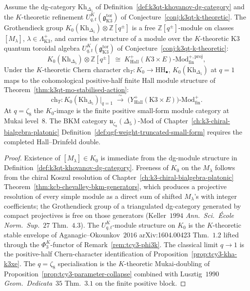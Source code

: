 \begin{theorem}
\label{thm:k3qt-k0-decategorification}
Assume the dg-category \(\mathrm{Kh}_{\Delta_5}\) of
Definition~\ref{def:k3qt-khovanov-dg-category} and the
\(K\)-theoretic refinement
\(U^K_{q,t}(\mathfrak g_{\mathrm{K3}}^{\mathrm{tor}})\) of
Conjecture~\ref{conj:k3qt-k-theoretic}.
The Grothendieck group $K_0(\mathrm{Kh}_{\Delta_5})\otimes\mathbb Z[q^\pm]$
is a free $\mathbb Z[q^\pm]$-module on classes $[M_\lambda]$,
$\lambda\in\Lambda_{\mathrm{K3}}^+$, and carries the structure of
a module over the $K$-theoretic K3 quantum toroidal algebra
$U^K_{q, t}(\mathfrak g_{\mathrm{K3}}^{\mathrm{tor}})$ of
Conjecture~\ref{conj:k3qt-k-theoretic}:
\[
 K_0(\mathrm{Kh}_{\Delta_5})\otimes\mathbb Z[q^\pm]
 \;\cong\;
 K^+_{\mathrm{Hall}}(K3\times E)\text{-}
 \mathrm{Mod}^{+,\mathrm{proj}}_{\mathrm{fin}},
\]
Under the $K$-theoretic Chern character
$\mathrm{ch}_T\colon K_0 \to \mathrm{HH}_\bullet$,
$K_0(\mathrm{Kh}_{\Delta_5})$ at $q = 1$ maps to the cohomological
positive-half finite Hall module structure of
Theorem~\ref{thm:k3qt-mo-stabilised-action}:
\[
 \mathrm{ch}_T : K_0(\mathrm{Kh}_{\Delta_5})\bigl|_{q = 1}
 \;\xrightarrow{\;\sim\;}\;
 \bigl(Y^+_{\mathrm{Hall}}(\mathrm{K3}\times E)\bigr)\text{-}
 \mathrm{Mod}^{+}_{\mathrm{fin}}.
\]
At $q=\zeta_8$ the $K_0$-image is the finite positive small-form
module category at Mukai level~$8$. The BKM category
$\mathfrak u_{\zeta_8}(\Delta_5)\text{-}\mathrm{Mod}$ of
Chapter~\ref{ch:k3-chiral-bialgebra-platonic}
Definition~\ref{def:qgf-weight-truncated-small-form} requires the
completed Hall--Drinfeld double.
\end{theorem}

\begin{proof}
Existence of $[M_\lambda]\in K_0$ is immediate from the dg-module
structure in Definition~\ref{def:k3qt-khovanov-dg-category}.
Freeness of $K_0$ on the $M_\lambda$ follows from the chiral Koszul
resolution of
Chapter~\ref{ch:k3-chiral-bialgebra-platonic}
Theorem~\ref{thm:kcb-chevalley-bkm-generators}, which produces a
projective resolution of every simple module as a direct sum of
shifted $M_\lambda$'s with integer coefficients; the Grothendieck
group of a triangulated dg-category generated by compact
projectives is free on those generators (Keller~$1994$
\emph{Ann.\ Sci.\ \'Ecole Norm.\ Sup.}~$27$ Thm.\ $4.3$).
The $U^K_{q, t}$-module structure on $K_0$ is the
$K$-theoretic stable envelope
of Aganagic--Okounkov~$2016$ arXiv:1604.00423 Thm.\ $1.2$ lifted
through the $\Phi_3^K$-functor of Remark~\ref{rem:tcy3-phi3k}.
The classical limit $q \to 1$ is the positive-half Chern-character
identification of Proposition~\ref{prop:tcy3-kha-k3xe}.
The $q = \zeta_8$ specialisation is the $K$-theoretic
Mukai-doubling of Proposition~\ref{prop:tcy3-parameter-collapse}
combined with Lusztig~$1990$ \emph{Geom.\ Dedicata}~$35$
Thm.\ $3.1$ on the finite positive block.
\end{proof}

